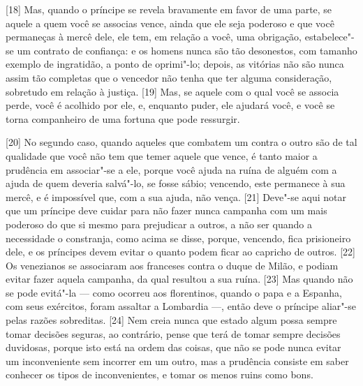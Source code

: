 {[}18{]} Mas, quando o príncipe se revela bravamente em favor de uma
parte, se aquele a quem você se associas vence, ainda que ele seja
poderoso e que você permaneças à mercê dele, ele tem, em relação a você,
uma obrigação, estabelece"-se um contrato de confiança: e os homens nunca
são tão desonestos, com tamanho exemplo de ingratidão, a ponto de
oprimi"-lo; depois, as vitórias não são nunca assim tão completas que o
vencedor não tenha que ter alguma consideração, sobretudo em relação à
justiça. {[}19{]} Mas, se aquele com o qual você se associa perde, você
é acolhido por ele, e, enquanto puder, ele ajudará você, e você se torna
companheiro de uma fortuna que pode ressurgir.

{[}20{]} No segundo caso,
quando aqueles que combatem um contra o outro são de tal qualidade que
você não tem que temer aquele que vence, é tanto maior a prudência em
associar"-se a ele, porque você ajuda na ruína de alguém com a ajuda de
quem deveria salvá"-lo, se fosse sábio; vencendo, este permanece à sua
mercê, e é impossível que, com a sua ajuda, não vença. {[}21{]} Deve"-se
aqui notar que um príncipe deve cuidar para não fazer nunca campanha com
um mais poderoso do que si mesmo para prejudicar a outros, a não ser
quando a necessidade o constranja, como acima se disse, porque,
vencendo, fica prisioneiro dele, e os príncipes devem evitar o quanto
podem ficar ao capricho de outros. {[}22{]} Os venezianos se associaram
aos franceses contra o duque de Milão, e podiam evitar fazer aquela campanha, da qual resultou a sua
ruína. {[}23{]} Mas quando não se pode evitá"-la --- como ocorreu aos
florentinos, quando o papa e a Espanha, com seus
exércitos, foram assaltar a Lombardia ---, então deve o príncipe aliar"-se
pelas razões sobreditas. {[}24{]} Nem creia nunca que estado algum possa
sempre tomar decisões seguras, ao contrário, pense que terá de tomar
sempre decisões duvidosas, porque isto está na ordem das coisas, que não
se pode nunca evitar um inconveniente sem incorrer em um outro, mas a
prudência consiste em saber conhecer os tipos de inconvenientes, e tomar
os menos ruins como bons.

